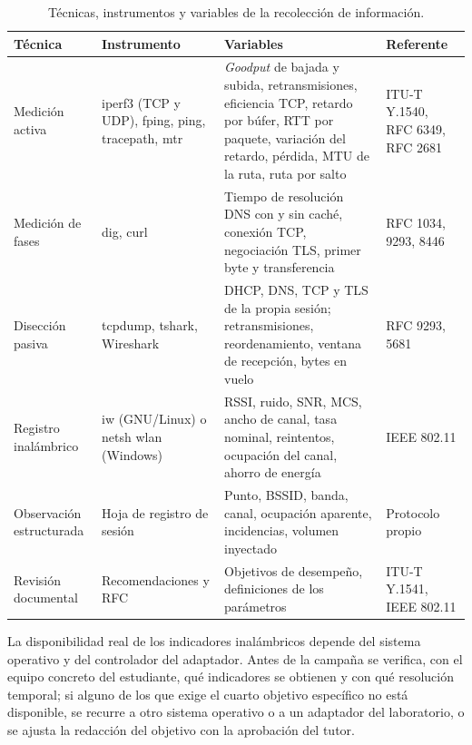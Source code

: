 \begin{table}[htbp]
  \centering
  \caption{Técnicas, instrumentos y variables de la recolección de información.}
  \label{tab:tecnicas}
  \footnotesize
  \renewcommand{\arraystretch}{1.25}
  \begin{tabularx}{\textwidth}{|>{\raggedright\arraybackslash}p{2.4cm}|>{\raggedright\arraybackslash}p{3.3cm}|>{\raggedright\arraybackslash}X|>{\raggedright\arraybackslash}p{2.3cm}|}
    \hline
    \textbf{Técnica} & \textbf{Instrumento} & \textbf{Variables} & \textbf{Referente} \\
    \hline
    Medición activa & iperf3 (TCP y UDP), fping, ping, tracepath, mtr & \textit{Goodput} de bajada y subida, retransmisiones, eficiencia TCP, retardo por búfer, RTT por paquete, variación del retardo, pérdida, MTU de la ruta, ruta por salto & ITU-T Y.1540, RFC 6349, RFC 2681 \\
    \hline
    Medición de fases & dig, curl & Tiempo de resolución DNS con y sin caché, conexión TCP, negociación TLS, primer byte y transferencia & RFC 1034, 9293, 8446 \\
    \hline
    Disección pasiva & tcpdump, tshark, Wireshark & DHCP, DNS, TCP y TLS de la propia sesión; retransmisiones, reordenamiento, ventana de recepción, bytes en vuelo & RFC 9293, 5681 \\
    \hline
    Registro inalámbrico & iw (GNU/Linux) o netsh wlan (Windows) & RSSI, ruido, SNR, MCS, ancho de canal, tasa nominal, reintentos, ocupación del canal, ahorro de energía & IEEE 802.11 \\
    \hline
    Observación estructurada & Hoja de registro de sesión & Punto, BSSID, banda, canal, ocupación aparente, incidencias, volumen inyectado & Protocolo propio \\
    \hline
    Revisión documental & Recomendaciones y RFC & Objetivos de desempeño, definiciones de los parámetros & ITU-T Y.1541, IEEE 802.11 \\
    \hline
  \end{tabularx}
  \vspace{2pt}
  \raggedright
\end{table}

La disponibilidad real de los indicadores inalámbricos depende del sistema operativo y del controlador del adaptador. Antes de la campaña se verifica, con el equipo concreto del estudiante, qué indicadores se obtienen y con qué resolución temporal; si alguno de los que exige el cuarto objetivo específico no está disponible, se recurre a otro sistema operativo o a un adaptador del laboratorio, o se ajusta la redacción del objetivo con la aprobación del tutor. 

